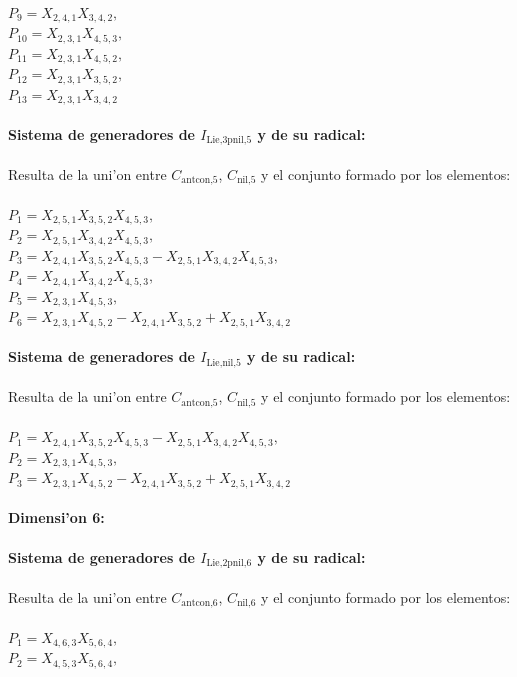 \documentclass[10pt]{beamer}
\begin{document}
{$P_{9}=X_{2,4,1}X_{3,4,2},$\\
$P_{10}=X_{2,3,1}X_{4,5,3},$\\
$P_{11}=X_{2,3,1}X_{4,5,2},$\\
$P_{12}=X_{2,3,1}X_{3,5,2},$\\
$P_{13}=X_{2,3,1}X_{3,4,2}$\\
\\
\textbf{Sistema de generadores de $I_{\text{Lie,3pnil,}5}$ y de su radical:}\\
\\
Resulta de la uni'on entre $C_{\text{antcon,}5}$, $C_{\text{nil,}5}$ y el conjunto formado por los elementos:\\
\\
$P_{1}= X_{2,5,1}X_{3,5,2}X_{4,5,3},$\\
$P_{2}= X_{2,5,1}X_{3,4,2}X_{4,5,3},$\\
$P_{3}= X_{2,4,1}X_{3,5,2}X_{4,5,3}-X_{2,5,1}X_{3,4,2}X_{4,5,3},$\\
$P_{4}= X_{2,4,1}X_{3,4,2}X_{4,5,3},$\\
$P_{5}= X_{2,3,1}X_{4,5,3},$\\
$P_{6}= X_{2,3,1}X_{4,5,2}-X_{2,4,1}X_{3,5,2}+X_{2,5,1}X_{3,4,2}$\\
\\
\textbf{Sistema de generadores de $I_{\text{Lie,nil,}5}$ y de su radical:}\\
\\
Resulta de la uni'on entre $C_{\text{antcon,}5}$, $C_{\text{nil,}5}$ y el conjunto formado por los elementos:\\
\\
$P_{1}=X_{2,4,1}X_{3,5,2}X_{4,5,3}-X_{2,5,1}X_{3,4,2}X_{4,5,3},$\\
$P_{2}=X_{2,3,1}X_{4,5,3},$\\
$P_{3}=X_{2,3,1}X_{4,5,2}-X_{2,4,1}X_{3,5,2}+X_{2,5,1}X_{3,4,2}$\\
\\
\textbf{Dimensi'on 6:}\\
\\
\textbf{Sistema de generadores de $I_{\text{Lie,2pnil,}6}$ y de su radical:}\\
\\
Resulta de la uni'on entre $C_{\text{antcon,}6}$, $C_{\text{nil,}6}$ y el conjunto formado por los elementos:\\
\\
$P_{1}=X_{4,6,3}X_{5,6,4},$\\
$P_{2}=X_{4,5,3}X_{5,6,4},$\\
}
\end{document}
